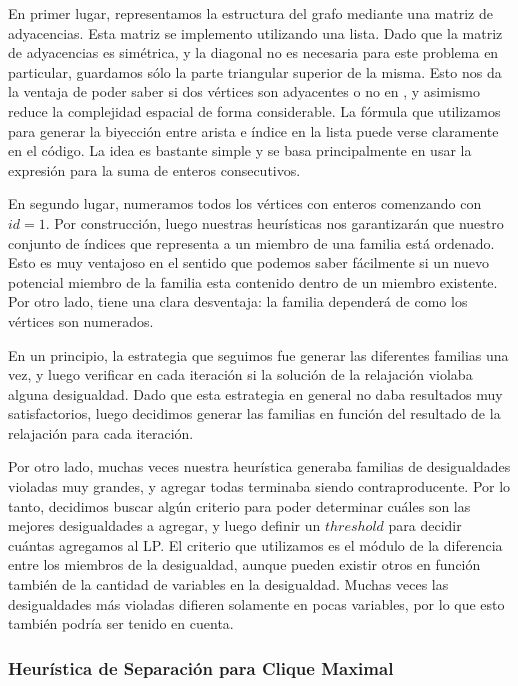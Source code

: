 En primer lugar, representamos la estructura del grafo mediante una matriz de adyacencias. Esta matriz se implemento utilizando una lista. Dado que la matriz de adyacencias es simétrica, y la diagonal no es necesaria para este problema en particular, guardamos sólo la parte triangular superior de la misma. Esto nos da la ventaja de poder saber si dos vértices son adyacentes o no en , y asimismo reduce la complejidad espacial de forma considerable. La fórmula que utilizamos para generar la biyección entre arista e índice en la lista puede verse claramente en el código. La idea es bastante simple y se basa principalmente en usar la expresión para la suma de enteros consecutivos.

En segundo lugar, numeramos todos los vértices con enteros comenzando con $id = 1$. Por construcción, luego nuestras heurísticas nos garantizarán que nuestro conjunto de índices que representa a un miembro de una familia está ordenado. Esto es muy ventajoso en el sentido que podemos saber fácilmente si un nuevo potencial miembro de la familia esta contenido dentro de un miembro existente. Por otro lado, tiene una clara desventaja: la familia dependerá de como los vértices son numerados.

En un principio, la estrategia que seguimos fue generar las diferentes familias una vez, y luego verificar en cada iteración si la solución de la relajación violaba alguna desigualdad. Dado que esta estrategia en general no daba resultados muy satisfactorios, luego decidimos generar las familias en función del resultado de la relajación para cada iteración.

Por otro lado, muchas veces nuestra heurística generaba familias de desigualdades violadas muy grandes, y agregar todas terminaba siendo contraproducente. Por lo tanto, decidimos buscar algún criterio para poder determinar cuáles son las mejores desigualdades a agregar, y luego definir un $threshold$ para decidir cuántas agregamos al LP. El criterio que utilizamos es el módulo de la diferencia entre los miembros de la desigualdad, aunque pueden existir otros en función también de la cantidad de variables en la desigualdad. Muchas veces las desigualdades más violadas difieren solamente en pocas variables, por lo que esto también podría ser tenido en cuenta.

\pagebreak

\subsubsection{Heurística de Separación para Clique Maximal}

